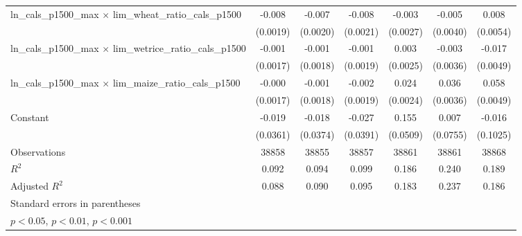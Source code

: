 {\begin{tabular}{l*{6}{c}}
\addlinespace
ln\_cals\_p1500\_max $\times$ lim\_wheat\_ratio\_cals\_p1500&      -0.008\sym{***}&      -0.007\sym{***}&      -0.008\sym{***}&      -0.003         &      -0.005         &       0.008         \\
                    &    (0.0019)         &    (0.0020)         &    (0.0021)         &    (0.0027)         &    (0.0040)         &    (0.0054)         \\
\addlinespace
ln\_cals\_p1500\_max $\times$ lim\_wetrice\_ratio\_cals\_p1500&      -0.001         &      -0.001         &      -0.001         &       0.003         &      -0.003         &      -0.017\sym{***}\\
                    &    (0.0017)         &    (0.0018)         &    (0.0019)         &    (0.0025)         &    (0.0036)         &    (0.0049)         \\
\addlinespace
ln\_cals\_p1500\_max $\times$ lim\_maize\_ratio\_cals\_p1500&      -0.000         &      -0.001         &      -0.002         &       0.024\sym{***}&       0.036\sym{***}&       0.058\sym{***}\\
                    &    (0.0017)         &    (0.0018)         &    (0.0019)         &    (0.0024)         &    (0.0036)         &    (0.0049)         \\
\addlinespace
Constant            &      -0.019         &      -0.018         &      -0.027         &       0.155\sym{**} &       0.007         &      -0.016         \\
                    &    (0.0361)         &    (0.0374)         &    (0.0391)         &    (0.0509)         &    (0.0755)         &    (0.1025)         \\
\midrule
Observations        &       38858         &       38855         &       38857         &       38861         &       38861         &       38868         \\
\(R^{2}\)           &       0.092         &       0.094         &       0.099         &       0.186         &       0.240         &       0.189         \\
Adjusted \(R^{2}\)  &       0.088         &       0.090         &       0.095         &       0.183         &       0.237         &       0.186         \\
\bottomrule
\multicolumn{7}{l}{\footnotesize Standard errors in parentheses}\\
\multicolumn{7}{l}{\footnotesize \sym{*} \(p<0.05\), \sym{**} \(p<0.01\), \sym{***} \(p<0.001\)}\\
\end{tabular}
}
